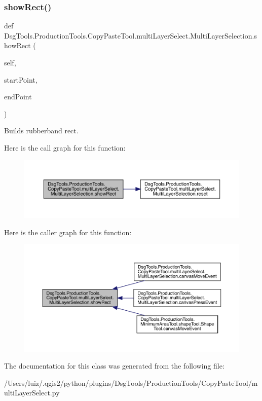 \subsubsection{\texorpdfstring{show\+Rect()}{showRect()}}
{\footnotesize\ttfamily def Dsg\+Tools.\+Production\+Tools.\+Copy\+Paste\+Tool.\+multi\+Layer\+Select.\+Multi\+Layer\+Selection.\+show\+Rect (\begin{DoxyParamCaption}\item[{}]{self,  }\item[{}]{start\+Point,  }\item[{}]{end\+Point }\end{DoxyParamCaption})}

\begin{DoxyVerb}Builds rubberband rect.
\end{DoxyVerb}
 Here is the call graph for this function\+:
\nopagebreak
\begin{figure}[H]
\begin{center}
\leavevmode
\includegraphics[width=350pt]{class_dsg_tools_1_1_production_tools_1_1_copy_paste_tool_1_1multi_layer_select_1_1_multi_layer_selection_a0aacbbcbe3d1d815cccc49cd1abe27af_cgraph}
\end{center}
\end{figure}
Here is the caller graph for this function\+:
\nopagebreak
\begin{figure}[H]
\begin{center}
\leavevmode
\includegraphics[width=350pt]{class_dsg_tools_1_1_production_tools_1_1_copy_paste_tool_1_1multi_layer_select_1_1_multi_layer_selection_a0aacbbcbe3d1d815cccc49cd1abe27af_icgraph}
\end{center}
\end{figure}


The documentation for this class was generated from the following file\+:\begin{DoxyCompactItemize}
\item 
/\+Users/luiz/.\+qgis2/python/plugins/\+Dsg\+Tools/\+Production\+Tools/\+Copy\+Paste\+Tool/multi\+Layer\+Select.\+py\end{DoxyCompactItemize}
